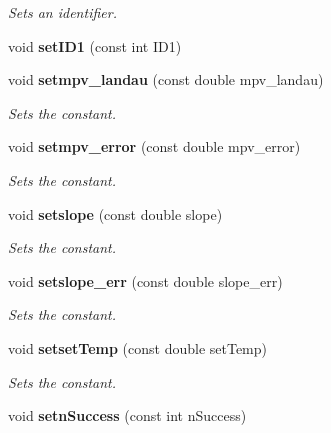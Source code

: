 \begin{DoxyCompactItemize}
\begin{DoxyCompactList}\small\item\em Sets an identifier. \item\end{DoxyCompactList}\item 
void {\bfseries setID1} (const int ID1)\label{classCALICE_1_1ScECALMIPfit_a7f60fc8bcc590ff732b64a9f4cef7a18}

\item 
void {\bf setmpv\_\-landau} (const double mpv\_\-landau)\label{classCALICE_1_1ScECALMIPfit_a30e0f590d9a913e0dc6ccca41bfff98d}

\begin{DoxyCompactList}\small\item\em Sets the constant. \item\end{DoxyCompactList}\item 
void {\bf setmpv\_\-error} (const double mpv\_\-error)\label{classCALICE_1_1ScECALMIPfit_a3ee1e7a68474f8de89b975b67038c513}

\begin{DoxyCompactList}\small\item\em Sets the constant. \item\end{DoxyCompactList}\item 
void {\bf setslope} (const double slope)\label{classCALICE_1_1ScECALMIPfit_a4bf2f2f183ce8021bd48dc37968bd95a}

\begin{DoxyCompactList}\small\item\em Sets the constant. \item\end{DoxyCompactList}\item 
void {\bf setslope\_\-err} (const double slope\_\-err)\label{classCALICE_1_1ScECALMIPfit_aecdb9b8aea46b4bd13151fa5ae49884f}

\begin{DoxyCompactList}\small\item\em Sets the constant. \item\end{DoxyCompactList}\item 
void {\bf setsetTemp} (const double setTemp)\label{classCALICE_1_1ScECALMIPfit_ac73a4be0593d464fb7a2778b403f29d0}

\begin{DoxyCompactList}\small\item\em Sets the constant. \item\end{DoxyCompactList}\item 
void {\bfseries setnSuccess} (const int nSuccess)\label{classCALICE_1_1ScECALMIPfit_a76a07cc7097784181a189c24611287cf}


\end{DoxyCompactItemize}

